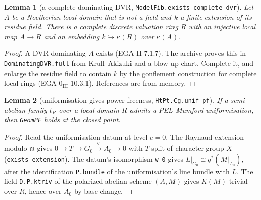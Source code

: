 \documentclass[11pt]{article}
\newcommand{\lean}[1]{\nolinkurl{#1}}
\newtheorem{lemma}{Lemma}[proposition]
\theoremstyle{remark}
\begin{document}
\begin{lemma}[a complete dominating DVR, \lean{ModelFib.exists_complete_dvr}]\label{lem:A3}
Let $A$ be a Noetherian local domain that is not a field and $k$ a finite extension of its residue field. There is a complete discrete valuation ring $R$ with an injective local map $A\to R$ and an embedding $k\hookrightarrow\kappa(R)$ over $\kappa(A)$.
\end{lemma}
\begin{proof}
A DVR dominating $A$ exists (EGA II 7.1.7). The archive proves this in \lean{DominatingDVR.full} from Krull--Akizuki and a blow-up chart. Complete it, and enlarge the residue field to contain $k$ by the gonflement construction for complete local rings (EGA $0_{\mathrm{III}}$ 10.3.1). References are from memory.
\end{proof}

\begin{lemma}[uniformisation gives power-freeness, \lean{HtPt.Cg.unif_pf}]\label{lem:A4}
If a semi-abelian family $t_R$ over a local domain $R$ admits a PEL Mumford uniformisation, then \lean{GeomPF} holds at the closed point.
\end{lemma}
\begin{proof}
Read the uniformisation datum at level $e=0$. The Raynaud extension modulo $\mathfrak m$ gives $0\to T\to G_0\xrightarrow{q}A_0\to0$ with $T$ split of character group $X$ (\lean{exists_extension}). The datum's isomorphism \lean{w}~\lean{0} gives $L|_{G_0}\cong q^*(M|_{A_0})$, after the identification \lean{P.bundle} of the uniformisation's line bundle with $L$. The field \lean{D.P.ktriv} of the polarized abelian scheme $(A,M)$ gives $K(M)$ trivial over $R$, hence over $A_0$ by base change.
\end{proof}
\end{document}
